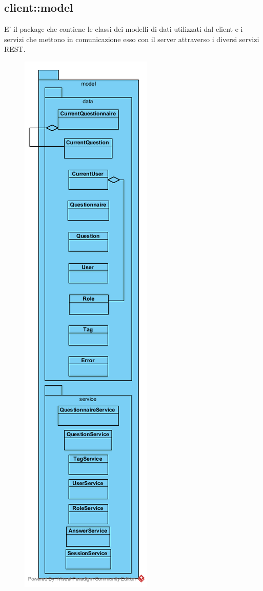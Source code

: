 \subsection{client::model}
E' il package che contiene le classi dei modelli di dati utilizzati
dal client e i servizi che mettono in comunicazione esso con il server
attraverso i diversi servizi REST.\begin{center}
	\begin{figure}[H]
		\centering \includegraphics[scale=4, max width=\textwidth, max height=\myheight]{../img/diagrammiClassi/client/model.png}

\end{figure}
\end{center}
